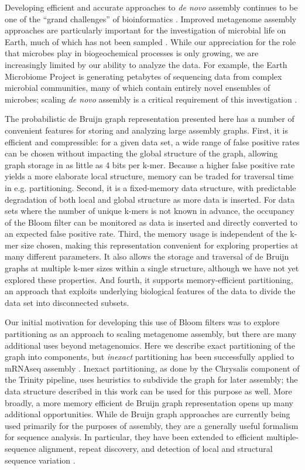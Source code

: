\documentclass[draft]{pnastwo}
\begin{document}
\begin{article}
Developing efficient and accurate approaches to {\em de novo} assembly
continues to be one of the ``grand challenges'' of bioinformatics
\cite{pubmed22147368}.  Improved metagenome assembly approaches are
particularly important for the investigation of microbial life on
Earth, much of which has not been sampled
\cite{terabasemetag,nrcbook}.  While our appreciation for the role
that microbes play in biogeochemical processes is only growing, we are
increasingly limited by our ability to analyze the data.  For example,
the Earth Microbiome Project is generating petabytes of sequencing
data from complex microbial communities, many of which contain
entirely novel ensembles of microbes; scaling {\em de novo} assembly is a
critical requirement of this investigation \cite{emp2010}.

The probabilistic de Bruijn graph representation presented here has a
number of convenient features for storing and analyzing large assembly
graphs.  First, it is efficient and compressible: for a given data
set, a wide range of false positive rates can be chosen without
impacting the global structure of the graph, allowing graph storage in
as little as 4 bits per k-mer.  Because a higher false positive rate
yields a more elaborate local structure, memory can be traded for
traversal time in e.g. partitioning.  Second, it is a fixed-memory
data structure, with predictable degradation of both local and global
structure as more data is inserted.  For data sets where the number of
unique k-mers is not known in advance, the occupancy of the Bloom
filter can be monitored as data is inserted and directly converted to
an expected false positive rate.  Third, the memory usage is
independent of the k-mer size chosen, making this representation
convenient for exploring properties at many different parameters.  It
also allows the storage and traversal of de Bruijn graphs at multiple
k-mer sizes within a single structure, although we have not yet
explored these properties.  And fourth, it supports memory-efficient
partitioning, an approach that exploits underlying biological features
of the data to divide the data set into disconnected subsets.

Our initial motivation for developing this use of Bloom filters was to
explore partitioning as an approach to scaling metagenome assembly,
but there are many additional uses beyond metagenomics.  Here we
describe exact partitioning of the graph into components, but {\em
  inexact} partitioning has been successfully applied to mRNAseq
assembly \cite{trinity}.  Inexact partitioning, as done by the
Chrysalis component of the Trinity pipeline, uses heuristics to
subdivide the graph for later assembly; the data structure described
in this work can be used for this purpose as well.  More broadly, a
more memory efficient de Bruijn graph representation opens up many
additional opportunities.  While de Bruijn graph approaches are
currently being used primarily for the purposes of assembly, they are
a generally useful formalism for sequence analysis. In particular,
they have been extended to efficient multiple-sequence alignment,
repeat discovery, and detection of local and structural sequence
variation \cite{zerbinothesis,zhang2003dna,price2005novo,cortex}.


\end{article}
\end{document}
